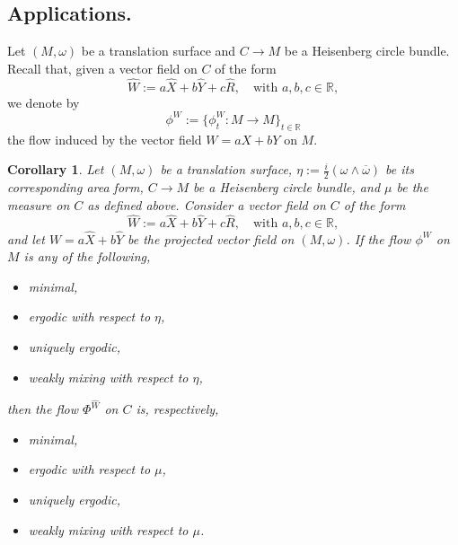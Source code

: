 \documentclass{amsart}
\newtheorem{corollary}[theorem]{Corollary}
\theoremstyle{definition}
\theoremstyle{remark}
\numberwithin{equation}{section}
\newcommand{\wX}{\widehat{X}}
\newcommand{\wY}{\widehat{Y}}
\newcommand{\wW}{\widehat{W}}
\newcommand{\<}{{\langle}}
\renewcommand{\>}{{\rangle}}
\begin{document}
\subsection{Applications.}\label{sec:applications} Let $(M,\omega)$ be a translation surface and $C \to M$ be a Heisenberg circle bundle. Recall that, given a vector field on $C$ of the form
    \[
    \widehat{W} := a \widehat{X} + b \widehat{Y} + c \widehat{R}, \quad \text{with }a,b,c \in \mathbb{R},
    \]
    we denote by
    \[
    \phi^W := \{\phi^W_t \colon M \to M \}_{t \in \mathbb{R}}
    \]
    the flow induced by the vector field $W = aX + bY$ on $M$.

\begin{corollary}
\label{cor:ethry}
Let $(M,\omega)$ be a translation surface, $\eta:= \frac{i}{2}(\omega \wedge \overline{\omega})$ be its corresponding area form, $C \to M$ be a Heisenberg circle bundle, and $\mu$ be the measure on $C$ as defined above. Consider a vector field on $C$ of the form
    \[
    \widehat{W} := a \widehat{X} + b \widehat{Y} + c \widehat{R}, \quad \text{with } a,b,c \in \mathbb{R},
    \]
and let $W = a\wX + b\wY$ be the projected vector field on $(M,\omega)$. If the flow $\phi^W$ on $M$ is any of the following,
\begin{itemize}
    \item minimal,
    \item ergodic with respect to $\eta$,
    \item uniquely ergodic,
    \item weakly mixing with respect to $\eta$,
\end{itemize}
then the flow $\Phi^{\wW}$ on $C$ is, respectively,
\begin{itemize}
    \item minimal,
    \item ergodic with respect to $\mu$,
    \item uniquely ergodic,
    \item weakly mixing with respect to $\mu$.
\end{itemize}
\end{corollary}
\end{document}
